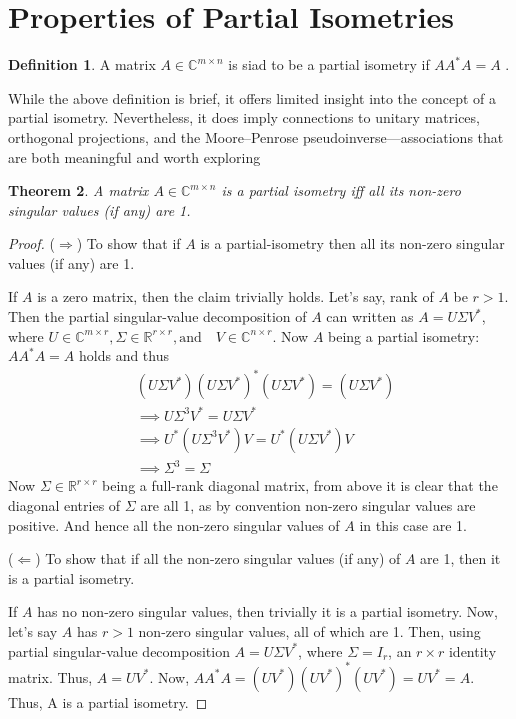 \documentclass[a4paper,fleqn]{cas-sc}
\newtheorem{theorem}{Theorem}[section]      %
\theoremstyle{definition}
\newtheorem{definition}[theorem]{Definition}
\theoremstyle{remark}
\begin{document}
\section{Properties of Partial Isometries}\label{sec:properties}

\begin{definition}
    A matrix $A \in \mathbb{C}^{m \times n}$ is siad to be a partial isometry if $AA^*A=A$ \cite{partialisometryarxiv}.
\end{definition}

While the above definition is brief, it offers limited insight into the concept of a partial isometry. Nevertheless, it does imply connections to unitary matrices, orthogonal projections, and the Moore–Penrose pseudoinverse—associations that are both meaningful and worth exploring

\begin{theorem}\label{thm:thm1}
    A matrix $A \in \mathbb{C}^{m \times n} $ is a partial isometry iff all its non-zero singular values (if any) are 1.
\end{theorem}
\begin{proof}
    ($\Rightarrow$) To show that if $A$ is a partial-isometry then all its non-zero singular values (if any) are 1.
    
    If $A$ is a zero matrix, then the claim trivially holds. Let's say, rank of $A$ be $r > 1$. Then the partial singular-value decomposition of $A$ can written as $A=U\Sigma V^*$, where $U \in \mathbb{C}^{m \times r}, \Sigma \in \mathbb{R}^{r \times r}, \text{and} \quad V \in \mathbb{C}^{n \times r}$. Now $A$ being a partial isometry: $AA^*A=A$ holds and thus 
    \begin{align*}
        &(U\Sigma V^*)(U\Sigma V^*)^*(U\Sigma V^*)=(U\Sigma V^*)\\
        &\implies U\Sigma^3V^* =U\Sigma V^*\\
        &\implies U^*(U\Sigma^3V^*)V = U^*(U\Sigma V^*)V\\
        &\implies \Sigma^3=\Sigma
    \end{align*}
    Now $\Sigma \in \mathbb{R}^{r \times r}$ being a full-rank diagonal matrix, from above it is clear that the diagonal entries of $\Sigma$ are all 1, as by convention non-zero singular values are positive. And hence all the non-zero singular values of $A$ in this case are 1.

    ($\Leftarrow$) To show that if all the non-zero singular values (if any) of $A$ are 1, then it is a partial isometry.

    If $A$ has no non-zero singular values, then trivially it is a partial isometry. Now, let's say $A$ has $r>1$ non-zero singular values, all of which are 1. Then, using partial singular-value decomposition $A=U\Sigma V^*$, where $\Sigma =I_r$, an $r \times r$ identity matrix. Thus, $A=UV^*$. Now, $AA^*A=(UV^*)(UV^*)^*(UV^*)=UV^*=A$. Thus, A is a partial isometry.
\end{proof}
\end{document}

